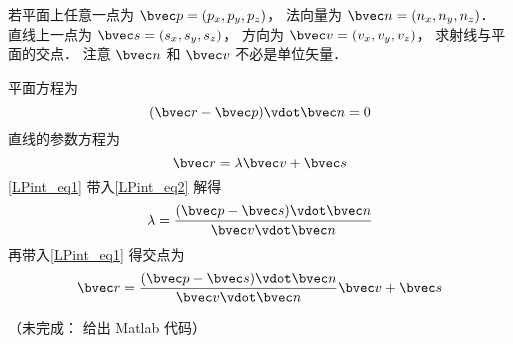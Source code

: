 

若平面上任意一点为 $\bvec p = (p_x, p_y, p_z)$， 法向量为 $\bvec n = (n_x, n_y, n_z)$． 直线上一点为 $\bvec s = (s_x, s_y, s_z)$， 方向为 $\bvec v = (v_x, v_y, v_z)$， 求射线与平面的交点． 注意 $\bvec n$ 和 $\bvec v$ 不必是单位矢量．

平面方程为
\begin{equation}\label{LPint_eq2}
(\bvec r - \bvec p) \vdot \bvec n = 0
\end{equation}
直线的参数方程为
\begin{equation}\label{LPint_eq1}
\bvec r = \lambda \bvec v + \bvec s
\end{equation}
\autoref{LPint_eq1} 带入\autoref{LPint_eq2} 解得
\begin{equation}
\lambda = \frac{(\bvec p - \bvec s)\vdot \bvec n}{\bvec v \vdot \bvec n}
\end{equation}
再带入\autoref{LPint_eq1} 得交点为
\begin{equation}\label{LPint_eq3}
\bvec r = \frac{(\bvec p - \bvec s)\vdot \bvec n}{\bvec v \vdot \bvec n} \bvec v + \bvec s
\end{equation}

（未完成： 给出 Matlab 代码）
